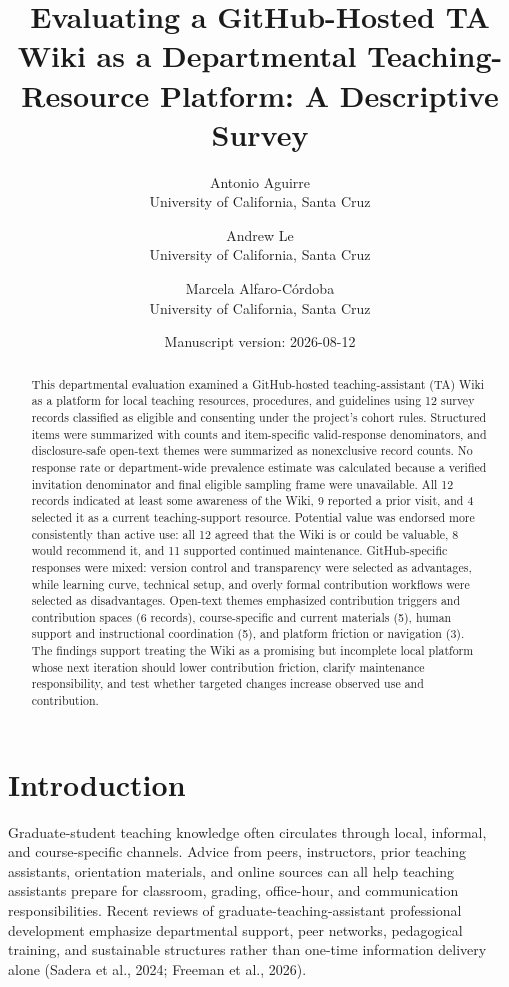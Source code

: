 \documentclass[11pt]{article}
\title{Evaluating a GitHub-Hosted TA Wiki as a Departmental Teaching-Resource Platform: A Descriptive Survey}
\author{Antonio Aguirre\\University of California, Santa Cruz \and Andrew Le\\University of California, Santa Cruz \and Marcela Alfaro-C\'ordoba\\University of California, Santa Cruz}
\date{Manuscript version: 2026-08-12}
\begin{document}
\maketitle
\linenumbers
\begin{abstract}
This departmental evaluation examined a GitHub-hosted teaching-assistant (TA) Wiki as a platform for local teaching resources, procedures, and guidelines using 12 survey records classified as eligible and consenting under the project's cohort rules. Structured items were summarized with counts and item-specific valid-response denominators, and disclosure-safe open-text themes were summarized as nonexclusive record counts. No response rate or department-wide prevalence estimate was calculated because a verified invitation denominator and final eligible sampling frame were unavailable. All 12 records indicated at least some awareness of the Wiki, 9 reported a prior visit, and 4 selected it as a current teaching-support resource. Potential value was endorsed more consistently than active use: all 12 agreed that the Wiki is or could be valuable, 8 would recommend it, and 11 supported continued maintenance. GitHub-specific responses were mixed: version control and transparency were selected as advantages, while learning curve, technical setup, and overly formal contribution workflows were selected as disadvantages. Open-text themes emphasized contribution triggers and contribution spaces (6 records), course-specific and current materials (5), human support and instructional coordination (5), and platform friction or navigation (3). The findings support treating the Wiki as a promising but incomplete local platform whose next iteration should lower contribution friction, clarify maintenance responsibility, and test whether targeted changes increase observed use and contribution.
\end{abstract}
\section{Introduction}
Graduate-student teaching knowledge often circulates through local, informal, and course-specific channels. Advice from peers, instructors, prior teaching assistants, orientation materials, and online sources can all help teaching assistants prepare for classroom, grading, office-hour, and communication responsibilities. Recent reviews of graduate-teaching-assistant professional development emphasize departmental support, peer networks, pedagogical training, and sustainable structures rather than one-time information delivery alone (Sadera et al., 2024; Freeman et al., 2026).
\end{document}
